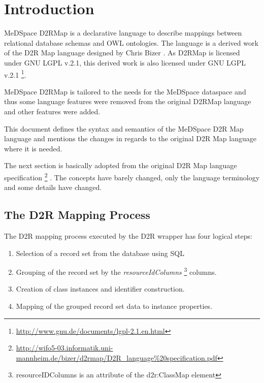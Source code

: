 \chapter{Introduction}

MeDSpace D2RMap is a declarative language to describe mappings between relational database schemas and OWL ontologies. The language is a derived work of the D2R Map language designed by Chris Bizer \cite{D2RMap}. As D2RMap is licensed under GNU LGPL v.2.1, this derived work is also licensed under GNU LGPL v.2.1 
\footnote{\url{http://www.gnu.de/documents/lgpl-2.1.en.html}}. 

MeDSpace D2RMap is tailored to the needs for the MeDSpace dataspace and thus some language features were removed from the original D2RMap language and other features  were added.

This document defines the syntax and semantics of the MeDSpace D2R Map language and mentions the
changes in regards to the original D2R Map language where it is needed.

The next section is basically adopted from the original D2R Map language specification \footnote{\url{http://wifo5-03.informatik.uni-mannheim.de/bizer/d2rmap/D2R\_language\%20specification.pdf}}
. The concepts have barely changed, only the language terminology and some details have changed.

\section{The D2R Mapping Process}

The D2R mapping process executed by the D2R wrapper has four logical steps:

\begin{enumerate}  
	\item Selection of a record set from the database using SQL 
	\item Grouping of the record set by the \textit{resourceIdColumns} \footnote{resourceIDColumns is an attribute of the d2r:ClassMap element}
	columns. 
	\item Creation of class instances and identifier construction. 
	\item Mapping of the grouped record set data to instance properties.
\end{enumerate}

